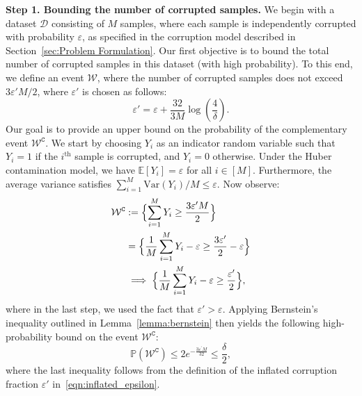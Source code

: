 \documentclass{article}
\newcommand{\mc}{\mathcal}
\begin{document}
\textbf{Step 1. Bounding the number of corrupted samples.} 
We begin with a dataset \(\mc{D}\) consisting of \(M\) samples, where each sample is independently corrupted with probability \(\varepsilon\), as specified in the corruption model described in Section~\ref{sec:Problem Formulation}. Our first objective is to bound the total number of corrupted samples in this dataset (with high probability). To this end, we define an event $\mathcal{W}$, where the number of corrupted samples does not exceed $3\varepsilon' M/2$, where $\varepsilon'$ is chosen as follows:
\begin{equation}\label{eqn:inflated_epsilon}
\varepsilon' = \varepsilon + \frac{32}{3M} \log\left( \frac{4}{\delta} \right).
\end{equation}
Our goal is to provide an upper bound on the probability of the complementary event $\mc{W}^{\texttt{C}}$. We start by choosing $Y_i$ as an indicator random variable such that $Y_i = 1$ if the $i^{\text{th}}$ sample is corrupted, and $Y_i = 0$ otherwise. Under the Huber contamination model, we have $\mathbb{E}[Y_i] = \varepsilon$ for all $i \in [M]$. Furthermore, the average variance satisfies $\sum_{i=1}^{M} \text{Var}(Y_i)/M \le \varepsilon$. Now observe:
\begin{equation}
\begin{aligned}
    \mathcal{W}^{\texttt{C}} &:=\Bigl\{ \sum_{i=1}^M Y_i \ge \frac{3\varepsilon^\prime M}{2} \Bigr\}\\
    & =\Bigl\{ \frac{1}{M}\sum_{i=1}^M Y_i - \varepsilon \ge \frac{3\varepsilon^\prime}{2}-\varepsilon \Bigr\}\\
    & \implies \Bigl\{ \frac{1}{M}\sum_{i=1}^M Y_i - \varepsilon \ge \frac{\varepsilon^\prime}{2}\Bigr\},
\end{aligned}
\end{equation}
where in the last step, we used the fact that $\varepsilon' > \varepsilon$. Applying Bernstein's inequality outlined in Lemma~\ref{lemma:bernstein} then yields the following high-probability bound on the event \(\mc{W}^{\texttt{C}}\):
\begin{equation}\label{eqn:bern_mom}
\mathbb{P}\left(\mathcal{W}^{\texttt{C}}\right) \le 2 e^{-\frac{3\varepsilon^\prime M}{32}} \leq \frac{\delta}{2},
\end{equation}
where the last inequality follows from the definition of the inflated corruption fraction $\varepsilon'$ in~\eqref{eqn:inflated_epsilon}. 
\end{document}
